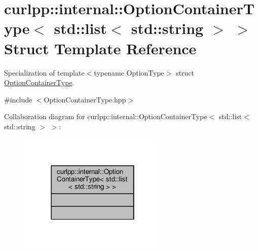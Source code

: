 \hypertarget{structcurlpp_1_1internal_1_1OptionContainerType_3_01std_1_1list_3_01std_1_1string_01_4_01_4}{\section{curlpp\-:\-:internal\-:\-:Option\-Container\-Type$<$ std\-:\-:list$<$ std\-:\-:string $>$ $>$ Struct Template Reference}
\label{structcurlpp_1_1internal_1_1OptionContainerType_3_01std_1_1list_3_01std_1_1string_01_4_01_4}
}


Specialization of template$<$typename Option\-Type$>$ struct \hyperlink{structcurlpp_1_1internal_1_1OptionContainerType}{Option\-Container\-Type}.  




{\ttfamily \#include $<$Option\-Container\-Type.\-hpp$>$}



Collaboration diagram for curlpp\-:\-:internal\-:\-:Option\-Container\-Type$<$ std\-:\-:list$<$ std\-:\-:string $>$ $>$\-:
\nopagebreak
\begin{figure}[H]
\begin{center}
\leavevmode
\includegraphics[width=202pt]{structcurlpp_1_1internal_1_1OptionContainerType_3_01std_1_1list_3_01std_1_1string_01_4_01_4__coll__graph}
\end{center}
\end{figure}
